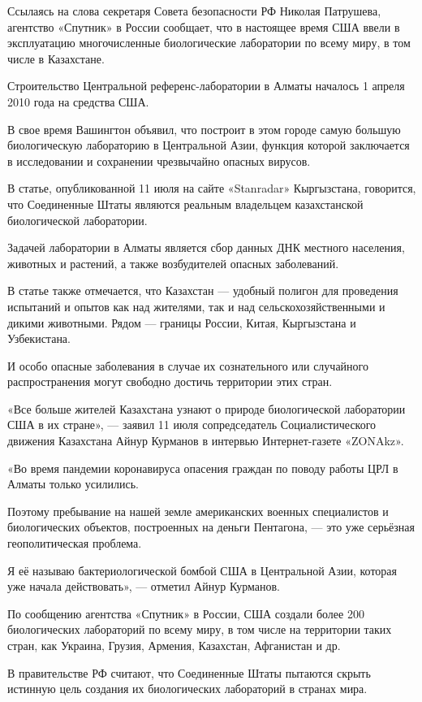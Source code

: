 Ссылаясь на слова секретаря Совета безопасности РФ Николая Патрушева, агентство
«Спутник» в России сообщает, что в настоящее время США ввели в эксплуатацию
многочисленные биологические лаборатории по всему миру, в том числе в
Казахстане.

Строительство Центральной референс-лаборатории в Алматы началось 1 апреля 2010
года на средства США.

В свое время Вашингтон объявил, что построит в этом городе самую большую
биологическую лабораторию в Центральной Азии, функция которой заключается в
исследовании и сохранении чрезвычайно опасных вирусов.

В статье, опубликованной 11 июля на сайте «Stanradar» Кыргызстана, говорится,
что Соединенные Штаты являются реальным владельцем казахстанской биологической
лаборатории.

Задачей лаборатории в Алматы является сбор данных ДНК местного населения,
животных и растений, а также возбудителей опасных заболеваний.

В статье также отмечается, что Казахстан — удобный полигон для проведения
испытаний и опытов как над жителями, так и над сельскохозяйственными и дикими
животными. Рядом — границы России, Китая, Кыргызстана и Узбекистана.

И особо опасные заболевания в случае их сознательного или случайного
распространения могут свободно достичь территории этих стран.

«Все больше жителей Казахстана узнают о природе биологической лаборатории США в
их стране», — заявил 11 июля сопредседатель Социалистического движения
Казахстана Айнур Курманов в интервью Интернет-газете «ZONAkz».

«Во время пандемии коронавируса опасения граждан по поводу работы ЦРЛ в Алматы
только усилились.

Поэтому пребывание на нашей земле американских военных специалистов и
биологических объектов, построенных на деньги Пентагона, — это уже серьёзная
геополитическая проблема.

Я её называю бактериологической бомбой США в Центральной Азии, которая уже
начала действовать», — отметил Айнур Курманов.

По сообщению агентства «Спутник» в России, США создали более 200 биологических
лабораторий по всему миру, в том числе на территории таких стран, как Украина,
Грузия, Армения, Казахстан, Афганистан и др.

В правительстве РФ считают, что Соединенные Штаты пытаются скрыть истинную цель
создания их биологических лабораторий в странах мира.

